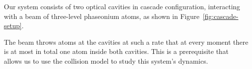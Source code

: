 \documentclass[entropy,article,submit,pdftex,moreauthors]{Definitions/mdpi}
\begin{document}
Our system consists of two optical cavities in cascade configuration, interacting with a beam of three-level phaseonium atoms, as shown in Figure~\ref{fig:cascade-setup}.

The beam throws atoms at the cavities at such a rate that at every moment there is at most in total one atom inside both cavities.  
This is a prerequisite that allows us to use the collision model to study this system's dynamics.
\end{document}
